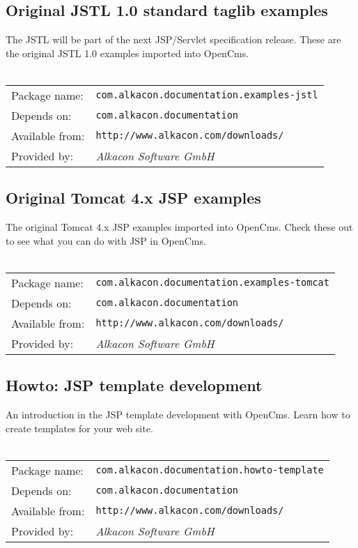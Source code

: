 \subsection{Original JSTL 1.0 standard taglib examples}
The JSTL will be part of the next JSP/Servlet specification release. These are the original 
JSTL 1.0 examples imported into OpenCms.
\\
\\
\begin{tabular}{ll}
Package name: & {\tt com.alkacon.documentation.examples-jstl}\\
Depends on: & {\tt com.alkacon.documentation}\\
Available from: & {\tt http://www.alkacon.com/downloads/}\\
Provided by: & {\em Alkacon Software GmbH}\\
\end{tabular}

\subsection{Original Tomcat 4.x JSP examples}
The original Tomcat 4.x JSP examples imported into OpenCms. Check these out to see what you can 
do with JSP in OpenCms.
\\
\\
\begin{tabular}{ll}
Package name: & {\tt com.alkacon.documentation.examples-tomcat}\\
Depends on: & {\tt com.alkacon.documentation}\\
Available from: & {\tt http://www.alkacon.com/downloads/}\\
Provided by: & {\em Alkacon Software GmbH}\\
\end{tabular}

\subsection{Howto: JSP template development}
An introduction in the JSP template development with OpenCms. Learn how to create templates 
for your web site.
\\
\\
\begin{tabular}{ll}
Package name: & {\tt com.alkacon.documentation.howto-template}\\
Depends on: & {\tt com.alkacon.documentation}\\
Available from: & {\tt http://www.alkacon.com/downloads/}\\
Provided by: & {\em Alkacon Software GmbH}\\
\end{tabular}

